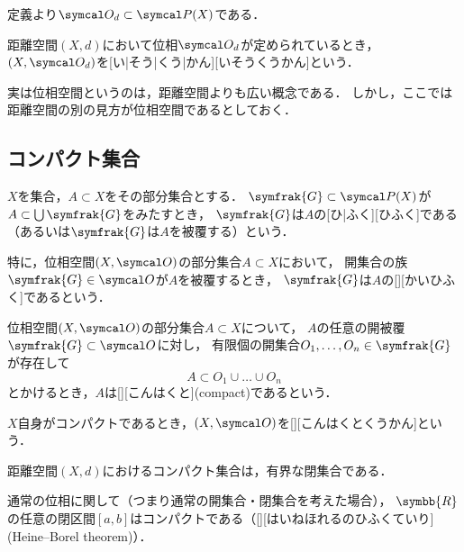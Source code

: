 \documentclass[../sotsu.tex]{subfiles}
\begin{document}
定義より$\topology_d \subset \pset(X)$である．

\begin{definition}
    \label{dfn:topological-space}
    距離空間$(X, d)$において位相$\topology_d$が定められているとき，
    $(X, \topology_d)$を[い|そう|くう|かん][いそうくうかん]という．
\end{definition}

実は位相空間というのは，距離空間よりも広い概念である．
しかし，ここでは距離空間の別の見方が位相空間であるとしておく．



\subsection{コンパクト集合}

\begin{definition}[被覆]
    $X$を集合，$A \subset X$をその部分集合とする．
    $\symfrak{G} \subset \pset(X)$が$A \subset \bigcup \symfrak{G}$をみたすとき，
    $\symfrak{G}$は$A$の[ひ|ふく][ひふく]である（あるいは$\symfrak{G}$は$A$を被覆する）という\cite[\S 22]{uchida-set-2020}．
\end{definition}

特に，位相空間$(X, \topology)$の部分集合$A \subset X$において，
開集合の族$\symfrak{G} \in \topology$が$A$を被覆するとき，
$\symfrak{G}$は$A$の[][かいひふく]であるという．

\begin{definition}[コンパクト集合]
    位相空間$(X, \topology)$の部分集合$A \subset X$について，
    $A$の任意の開被覆$\symfrak{G} \subset \topology$に対し，
    有限個の開集合$O_1, \dots, O_n \in \symfrak{G}$が存在して
    \begin{equation*}
        A \subset O_1 \cup \dots \cup O_n
    \end{equation*}
    とかけるとき，$A$は[][こんはくと](compact)であるという．

    $X$自身がコンパクトであるとき，$(X, \topology)$を[][こんはくとくうかん]という\cite[\S 22]{uchida-set-2020}．
\end{definition}

\begin{proposition}
    \label{thm:compact-set-is-bounded-closed-set}
    距離空間$(X, d)$におけるコンパクト集合は，有界な閉集合である\cite[\S 22]{uchida-set-2020}．
\end{proposition}

\begin{theorem}
    \label{thm:Heine-Borel-theorem}
    通常の位相に関して（つまり通常の開集合・閉集合を考えた場合），
    $\symbb{R}$の任意の閉区間$[a, b]$はコンパクトである（[][はいねほれるのひふくていり](Heine--Borel theorem)）\cite[\S 22]{uchida-set-2020}．
\end{theorem}
\end{document}
